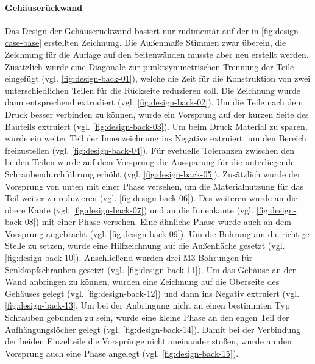 \paragraph{Gehäuserückwand}
Das Design der Gehäuserückwand basiert nur rudimentär auf der in \ref{fig:design-case-base} erstellten Zeichnung. Die Außenmaße Stimmen zwar überein, die Zeichnung für die Auflage auf den Seitenwänden musste aber neu erstellt werden. Zusätzlich wurde eine Diagonale zur punktsymmetrischen Trennung der Teile eingefügt (vgl. \ref{fig:design-back-01}), welche die Zeit für die Konstruktion von zwei unterschiedlichen Teilen für die Rückseite reduzieren soll. Die Zeichnung wurde dann entsprechend extrudiert (vgl. \ref{fig:design-back-02}). Um die Teile nach dem Druck besser verbinden zu können, wurde ein Vorsprung auf der kurzen Seite des Bauteils extruiert (vgl. \ref{fig:design-back-03}). Um beim Druck Material zu sparen, wurde ein weiter Teil der Innenzeichnung ins Negative extruiert, um den Bereich freizustellen (vgl. \ref{fig:design-back-04}). Für evetuelle Toleranzen zwischen den beiden Teilen wurde auf dem Vorsprung die Aussparung für die unterliegende Schraubendurchführung erhöht (vgl. \ref{fig:design-back-05}). Zusätzlich wurde der Vorsprung von unten mit einer Phase versehen, um die Materialnutzung für das Teil weiter zu reduzieren (vgl. \ref{fig:design-back-06}). Des weiteren wurde an die obere Kante (vgl. \ref{fig:design-back-07}) und an die Innenkante (vgl. \ref{fig:design-back-08}) mit einer Phase versehen. Eine ähnliche Phase wurde auch an dem Vorsprung angebracht (vgl. \ref{fig:design-back-09}). Um die Bohrung am die richtige Stelle zu setzen, wurde eine Hilfzeichnung auf die Außenfläche gesetzt (vgl. \ref{fig:design-back-10}). Anschließend wurden drei M3-Bohrungen für Senkkopfschrauben gesetzt (vgl. \ref{fig:design-back-11}). Um das Gehäuse an der Wand anbringen zu können, wurden eine Zeichnung auf die Oberseite des Gehäuses gelegt (vgl. \ref{fig:design-back-12}) und dann ins Negativ extruiert (vgl. \ref{fig:design-back-13}. Um bei der Anbringung nicht an einen bestimmten Typ Schrauben gebunden zu sein, wurde eine kleine Phase an den engen Teil der Aufhängungslöcher gelegt (vgl. \ref{fig:design-back-14}). Damit bei der Verbindung der beiden Einzelteile die Vorsprünge nicht aneinander stoßen, wurde an den Vorsprung auch eine Phase angelegt (vgl. \ref{fig:design-back-15}).
